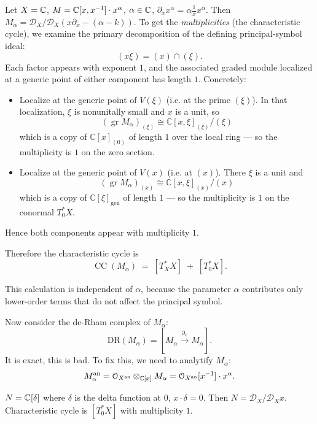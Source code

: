 \documentclass[12pt]{amsart}
\numberwithin{equation}{section}
\begin{document}
\begin{examp}
Let $X = {\mathbb {C}}$, $M = {\mathbb {C}}[x,x^{-1}] \cdot x^{\alpha}$, $\alpha \in {\mathbb {C}}$, $\partial_x x^{\alpha} = \alpha \frac{1}{x} x^{\alpha}$. Then $M_{\alpha} = \mathcal{D}_X/\mathcal{D}_X(x\partial_x - (\alpha-k))$. To get the \emph{multiplicities} (the characteristic cycle), we examine the
primary decomposition of the defining principal-symbol ideal:
\[
(x\xi) = (x) \cap (\xi).
\]
Each factor appears with exponent $1$, and the associated graded module localized
at a generic point of either component has length $1$.
Concretely:

\begin{itemize}
  \item Localize at the generic point of $V(\xi)$ (i.e. at the prime $(\xi)$).
  In that localization, $\xi$ is nonunitally small and $x$ is a unit, so
  \[
  (\operatorname{gr} M_\alpha)_{(\xi)} \cong
  \mathbb{C}[x,\xi]_{(\xi)}/(\xi)
  \]
  which is a copy of $\mathbb{C}[x]_{(0)}$ of length $1$ over the local ring —
  so the multiplicity is $1$ on the zero section.

  \item Localize at the generic point of $V(x)$ (i.e. at $(x)$).
  There $\xi$ is a unit and
  \[
  (\operatorname{gr} M_\alpha)_{(x)} \cong
  \mathbb{C}[x,\xi]_{(x)}/(x)
  \]
  which is a copy of $\mathbb{C}[\xi]_{\mathrm{gen}}$ of length $1$ —
  so the multiplicity is $1$ on the conormal $T^*_0 X$.
\end{itemize}

Hence both components appear with multiplicity $1$.

Therefore the characteristic cycle is
\[
\boxed{
  \operatorname{CC}(M_\alpha)
  \;=\;
  [T^*_X X] \;+\; [T^*_0 X].
}
\]

This calculation is independent of $\alpha$, because the parameter $\alpha$
contributes only lower-order terms that do not affect the principal symbol.

\end{examp}

Now consider the de-Rham complex of $M_{\alpha}$:
\[\mathrm{DR}(M_{\alpha}) = [M_{\alpha} \xrightarrow{\partial_x} M_{\alpha}].\]
It is exact, this is bad. To fix this, we need to analytify $M_{\alpha}$:
\[M_{\alpha}^{\mathrm{an}} = \mathcal{O}_{X^{\mathrm{an}}} \otimes_{{\mathbb {C}}[x]} M_{\alpha} = \mathcal{O}_{X^{\mathrm{an}}}[x^{-1}] \cdot x^{\alpha}.\]


\begin{examp}
  $N = {\mathbb {C}}[\delta]$ where $\delta$ is the delta function at $0$, $x \cdot \delta = 0$. Then $N = \mathcal{D}_X/\mathcal{D}_X x$. Characteristic cycle is $[T^*_0 X]$ with multiplicity $1$.
\end{examp}
\end{document}
